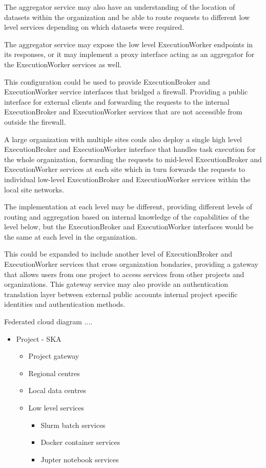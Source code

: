 \documentclass[11pt,a4paper]{ivoa}
\newcommand{\execbrokerclass} {ExecutionBroker}
\newcommand{\execworkerclass} {ExecutionWorker}
\newcommand{\dataset} {dataset}
\begin{document}
The aggregator service may also have an understanding of the location of \dataset{}s within the organization and
be able to route requests to different low level services depending on which \dataset{}s were required.

The aggregator service may expose the low level \execworkerclass{} endpoints in its responses,
or it may implement a proxy interface acting as an aggregator for the \execworkerclass{}
services as well.

This configuration could be used to provide \execbrokerclass{} and \execworkerclass{} service interfaces
that bridged a firewall. Providing a public interface for external clients and forwarding the requests
to the internal \execbrokerclass{} and \execworkerclass{} services that are not accessible from outside the
firewall.

A large organization with multiple sites couls also deploy a single high level \execbrokerclass{} and \execworkerclass{}
interface that handles task execution for the whole organization, forwarding the requests to mid-level
\execbrokerclass{} and \execworkerclass{} services at each site which in turn forwards the requests to
individual low-level \execbrokerclass{} and \execworkerclass{} services within the local site networks.

The implementation at each level may be different, providing different levels of routing
and aggregation based on internal knowledge of the capabilities of the level below,
but the \execbrokerclass{} and \execworkerclass{} interfaces would be the same at each level
in the organization.

This could be expanded to include another level of \execbrokerclass{} and \execworkerclass{} services that
cross organization bondaries, providing a gateway that allows users from one project to access services
from other projects and organizations. This gateway service may also provide an authentication translation
layer between external public accounts internal project specific identities and authentication methods.

Federated cloud diagram ....

\begin{itemize}
    \item Project - SKA
    \begin{itemize}
        \item Project gateway
        \item Regional centres
        \item Local data centres
        \item Low level services
        \begin{itemize}
            \item Slurm batch services
            \item Docker container services
            \item Jupter notebook services
        \end{itemize}
    \end{itemize}
\end{itemize}
\end{document}
